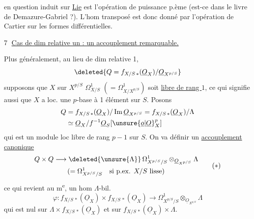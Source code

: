 en question induit sur \uline{Lie} est l'opération de puissance p.ème (est-ce dans le livre de Demazure-Gabriel ?).  L'hom transposé est donc donné par l'opération de Cartier sur les formes différentielles.

\textcircled{7} \uline{Cas  de  dim relative un : un accouplement remarquable.}

 Plus généralement, au lieu de dim relative 1,
\[
 \deleted{Q=f_{X/S\,*}(\underline O_X)/\underline O_{X^{p/S}}}
\]
supposons que $X$ sur $X^{p/S}$   $\Omega^1_{X/S}$ $(=\Omega^1_{X/X^{p/S}})$ soit \uline{libre de rang $1$}, ce qui signifie aussi que $X$ a loc. une $p$-base à 1 élément sur $S$. Posons
\[
\begin{aligned}
 Q&=f_{X/S\,*}(\underline O_X)/\operatorname{Im}\underline O_{X^{p/S}}
 =f_{X/S\,*}(\underline O_X)/\Lambda\\
 &\simeq\underline O_X/f^{-1}\underline O_S[\unsure{\underline o|\underline O}_X^p]
\end{aligned}
\]
qui est un module loc libre de rang $p-1$ sur $S$. On va définir un \uline{accouplement  canonique}
\[
 \begin{aligned}
 Q\times Q&\longrightarrow\deleted{\unsure{\Lambda}}\,\Omega^1_{X^{p/S}/S}
 \otimes_{\underline O_{X^{p/S}}}\Lambda\\
 &\qquad(=\Omega^1_{X^{p/S}/S}\quad\text{si p.ex. $X/S$ lisse})
 \end{aligned}\tag*{($\ast$)}
\]
\margin{$-$}   ce qui revient au m\textsuperscript{e}, un hom $\Lambda$-bil.
\[
 \varphi:f_{X/S\,*}(\underline O_X)\times f_{X/S\,*}(\underline O_X)
 \longrightarrow\Omega^1_{X^{p/S}/S}\otimes_{\underline O_{X^{p/S}}}\Lambda
\]
qui est nul sur $\Lambda\times f_{X/S\,*}(\underline O_X)$ et sur $f_{X/S\,*}(\underline O_X)\times\Lambda$.

